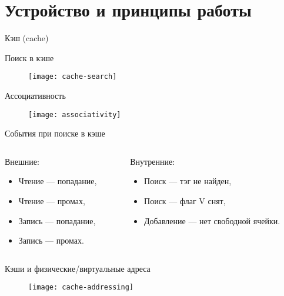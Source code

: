 \section{Устройство и принципы работы}

\begin{frame}{Кэш (\abbr cache)}
\centering
{}
\end{frame}

\begin{frame}{Поиск в кэше}
\begin{figure}[htpb]
    \centering
    \texttt{[image: cache-search]}
\end{figure}
\end{frame}

\begin{frame}{Ассоциативность}
\begin{figure}[htpb]
    \centering
    \texttt{[image: associativity]}
\end{figure}
\end{frame}

\begin{frame}{События при поиске в кэше}
\begin{columns}[t]
    \begin{column}[T]{0.5\textwidth}
    Внешние:
    \begin{itemize}
        \item Чтение --- попадание,
        \item Чтение --- промах,
        \item Запись --- попадание,
        \item Запись --- промах.
    \end{itemize}
    \end{column}
    \begin{column}[T]{0.5\textwidth}
    Внутренние:
    \begin{itemize}
        \item Поиск --- тэг не найден,
        \item Поиск --- флаг V снят,
        \item Добавление --- нет свободной ячейки.
    \end{itemize}
    \end{column}
\end{columns}
\end{frame}

\begin{frame}{Кэши и физические/виртуальные адреса}
\begin{figure}[htpb]
    \centering
    \texttt{[image: cache-addressing]}
\end{figure}
\end{frame}

